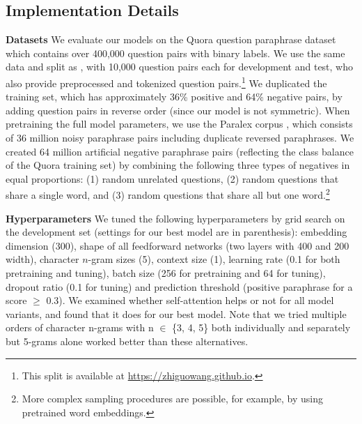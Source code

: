 \documentclass[11pt,letterpaper]{article}
\begin{document}
\subsection{Implementation Details}
\noindent \textbf{Datasets}  We evaluate our models on the Quora question paraphrase dataset which contains over 400,000 question pairs with binary labels.  We use the same data and split as , with 10,000 question pairs each for development and test, who also provide preprocessed and tokenized question pairs.\footnote{This split is available at \url{https://zhiguowang.github.io}.}  We duplicated the training set, which has approximately 36\% positive and 64\% negative pairs, by adding question pairs in reverse order (since our model is not symmetric). When pretraining the full model parameters, we use the Paralex corpus \cite{paralex}, which consists of 36 million noisy paraphrase pairs including duplicate reversed paraphrases.  We created 64 million artificial negative paraphrase pairs (reflecting the class balance of the Quora training set) by combining the following three types of negatives in equal proportions: (1) random unrelated questions, (2) random questions that share a single word, and (3) random questions that share all but one word.\footnote{More complex sampling procedures are possible, for example, by using pretrained word embeddings.}

\noindent \textbf{Hyperparameters} 
We tuned the following hyperparameters by grid search on the development set (settings for our best model are in parenthesis): embedding dimension (300), shape of all feedforward networks (two layers with 400 and 200 width), character $n$-gram sizes (5), context size (1), learning rate (0.1 for both pretraining and tuning), batch size (256 for pretraining and 64 for tuning), dropout ratio (0.1 for tuning) and prediction threshold (positive paraphrase for a score $\ge$ 0.3).  We examined whether self-attention helps or not for all model variants, and found that it does for our best model.
Note that we tried multiple orders of character n-grams with n $\in$ \{3, 4, 5\} both individually and separately but 5-grams alone worked better than these alternatives.
\end{document}
